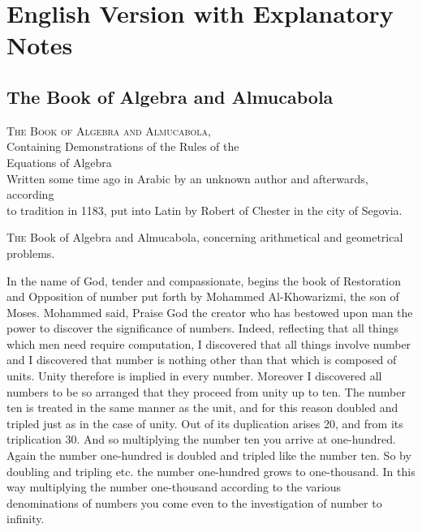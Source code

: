 \documentclass[11pt,a4paper]{book}
\begin{document}
\part{English Version with Explanatory Notes}

\chapter*{The Book of Algebra and Almucabola}

\begin{center}
\textsc{The Book of Algebra and Almucabola,}\\
Containing Demonstrations of the Rules of the\\
Equations of Algebra\\[0.5cm]
Written some time ago in Arabic by an unknown author and afterwards, according\\
to tradition in 1183, put into Latin by Robert of Chester in the city of Segovia.
\end{center}

\vspace{0.5cm}

\lettrine[lines=3]{T}{he} Book of Algebra and Almucabola, concerning arithmetical and geometrical problems.

In the name of God, tender and compassionate, begins the book of Restoration and Opposition of number put forth by Mohammed Al-Khowarizmi, the son of Moses. Mohammed said, Praise God the creator who has bestowed upon man the power to discover the significance of numbers. Indeed, reflecting that all things which men need require computation, I discovered that all things involve number and I discovered that number is nothing other than that which is composed of units. Unity therefore is implied in every number. Moreover I discovered all numbers to be so arranged that they proceed from unity up to ten. The number ten is treated in the same manner as the unit, and for this reason doubled and tripled just as in the case of unity. Out of its duplication arises 20, and from its triplication 30. And so multiplying the number ten you arrive at one-hundred. Again the number one-hundred is doubled and tripled like the number ten. So by doubling and tripling etc. the number one-hundred grows to one-thousand. In this way multiplying the number one-thousand according to the various denominations of numbers you come even to the investigation of number to infinity.
\end{document}
